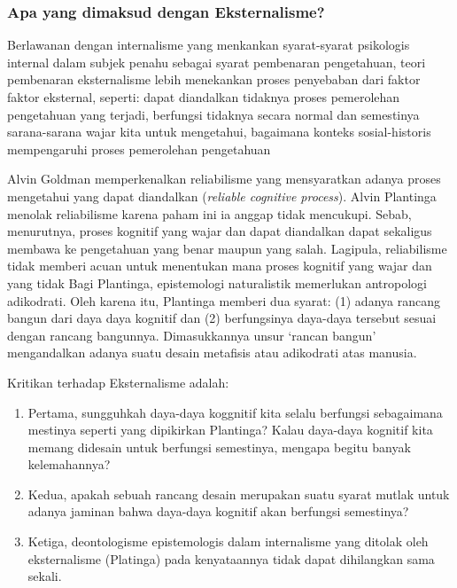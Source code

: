 \documentclass[11pt,twoside,a5paper,openany]{memoir}
\def\tightlist{}
\begin{document}
\hypertarget{apa-yang-dimaksud-dengan-eksternalisme}{%
\subsubsection{Apa yang dimaksud dengan
Eksternalisme?}\label{apa-yang-dimaksud-dengan-eksternalisme}}

Berlawanan dengan internalisme yang menkankan syarat-syarat psikologis
internal dalam subjek penahu sebagai syarat pembenaran pengetahuan,
teori pembenaran eksternalisme lebih menekankan proses penyebaban dari
faktor faktor eksternal, seperti: dapat diandalkan tidaknya proses
pemerolehan pengetahuan yang terjadi, berfungsi tidaknya secara normal
dan semestinya sarana-sarana wajar kita untuk mengetahui, bagaimana
konteks sosial-historis mempengaruhi proses pemerolehan pengetahuan

Alvin Goldman memperkenalkan reliabilisme yang mensyaratkan adanya
proses mengetahui yang dapat diandalkan (\emph{reliable cognitive
process}). Alvin Plantinga menolak reliabilisme karena paham ini ia
anggap tidak mencukupi. Sebab, menurutnya, proses kognitif yang wajar
dan dapat diandalkan dapat sekaligus membawa ke pengetahuan yang benar
maupun yang salah. Lagipula, reliabilisme tidak memberi acuan untuk
menentukan mana proses kognitif yang wajar dan yang tidak Bagi
Plantinga, epistemologi naturalistik memerlukan antropologi adikodrati.
Oleh karena itu, Plantinga memberi dua syarat: (1) adanya rancang bangun
dari daya daya kognitif dan (2) berfungsinya daya-daya tersebut sesuai
dengan rancang bangunnya. Dimasukkannya unsur `rancan bangun'
mengandalkan adanya suatu desain metafisis atau adikodrati atas manusia.

Kritikan terhadap Eksternalisme adalah:

\begin{enumerate}
\def\labelenumi{\arabic{enumi}.}
\tightlist
\item
  Pertama, sungguhkah daya-daya koggnitif kita selalu berfungsi
  sebagaimana mestinya seperti yang dipikirkan Plantinga? Kalau
  daya-daya kognitif kita memang didesain untuk berfungsi semestinya,
  mengapa begitu banyak kelemahannya?
\item
  Kedua, apakah sebuah rancang desain merupakan suatu syarat mutlak
  untuk adanya jaminan bahwa daya-daya kognitif akan berfungsi
  semestinya?
\item
  Ketiga, deontologisme epistemologis dalam internalisme yang ditolak
  oleh eksternalisme (Platinga) pada kenyataannya tidak dapat
  dihilangkan sama sekali.
\end{enumerate}
\end{document}
